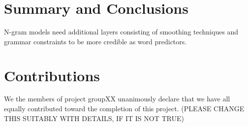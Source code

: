 \documentclass[a4paper,12pt]{article}
\begin{document}
\section{Summary and Conclusions}
\label{sec:summary}

N-gram models need additional layers consisting of smoothing techniques and grammar constraints to be more credible as  word predictors.


\section{Contributions}
\label{sec:contributions}
We the members of project groupXX unanimously declare that 
we have all equally contributed toward the completion of this
project. (PLEASE CHANGE THIS SUITABLY WITH DETAILS, IF IT IS NOT TRUE)






\end{document}
